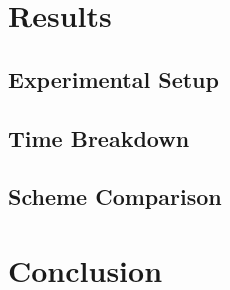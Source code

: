 \documentclass[12pt]{article}
\begin{document}
    \section{Results}
        \subsection{Experimental Setup}
        \subsection{Time Breakdown}
        \subsection{Scheme Comparison}
        \subsection{}
    
    
    \section{Conclusion}


    \begin{thebibliography}{00}
    	\bibitem{}
    
    \end{thebibliography}
\end{document}

